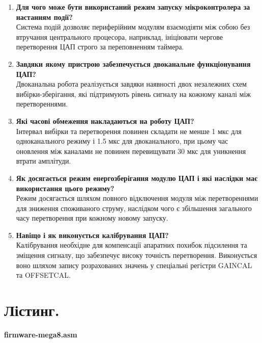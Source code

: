 \documentclass[14pt, a4paper]{extreport}
\begin{document}
\begin{enumerate}
		\item \textbf{Для чого може бути використаний режим запуску мікроконтролера за настанням події?} \\ Система подій дозволяє периферійним модулям взаємодіяти між собою без втручання центрального процесора, наприклад, ініціювати чергове перетворення ЦАП строго за переповненням таймера.
		
		\item \textbf{Завдяки якому пристрою забезпечується двоканальне функціонування ЦАП?} \\ Двоканальна робота реалізується завдяки наявності двох незалежних схем вибірки-зберігання, які підтримують рівень сигналу на кожному каналі між перетвореннями.
		
		\item \textbf{Які часові обмеження накладаються на роботу ЦАП?} \\ Інтервал вибірки та перетворення повинен складати не менше 1 мкс для одноканального режиму і 1.5 мкс для двоканального, при цьому час оновлення між каналами не повинен перевищувати 30 мкс для уникнення втрати амплітуди.
		
		\item \textbf{Як досягається режим енергозберігання модулю ЦАП і які наслідки має використання цього режиму?} \\ Режим досягається шляхом повного відключення модуля між перетвореннями для зниження споживаного струму, наслідком чого є збільшення загального часу перетворення при кожному новому запуску.
		
		\item \textbf{Навіщо і як виконується калібрування ЦАП?} \\ Калібрування необхідне для компенсації апаратних похибок підсилення та зміщення сигналу, що забезпечує високу точність перетворення. Виконується воно шляхом запису розрахованих значень у спеціальні регістри GAINCAL та OFFSETCAL.
	\end{enumerate}
	
	\pagebreak
	
	\section*{Лістинг.}
	
	\textbf{firmware-mega8.asm}
	
\end{document}
